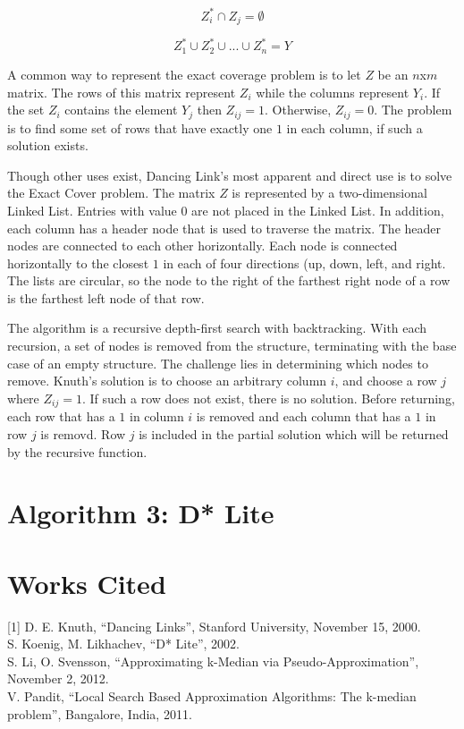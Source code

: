 \documentclass[11pt]{article}
\begin{document}
$$Z_{i}^{\ast} \cap Z_{j} = \emptyset $$

$$Z_{1}^{\ast} \cup Z_{2}^{\ast} \cup ... \cup Z_{n}^{\ast} = Y$$

A common way to represent the exact coverage problem is to let $Z$ be an $n$x$m$ matrix. The rows of  this matrix represent $Z_i$ while the columns represent $Y_i$. If the set $Z_i$ contains the element $Y_j$ then $Z_{ij}=1$. Otherwise, $Z_{ij}=0$. The problem is to find some set of rows that have exactly one $1$ in each column, if such a solution exists.

Though other uses exist, Dancing Link's most apparent and direct use is to solve the Exact Cover problem. The matrix $Z$ is represented by a two-dimensional Linked List. Entries with value $0$ are not placed in the Linked List. In addition, each column has a header node that is used to traverse the matrix. The header nodes are connected to each other horizontally. Each node is connected horizontally to the closest $1$ in each of four directions (up, down, left, and right. The lists are circular, so the node to the right of the farthest right node of a row is the farthest left node of that row.

The algorithm is a recursive depth-first search with backtracking. With each recursion, a set of nodes is removed from the structure, terminating with the base case of an empty structure. The challenge lies in determining which nodes to remove. Knuth's solution is to choose an arbitrary column $i$, and choose a row $j$ where $Z_{ij}=1$. If such a row does not exist, there is no solution. Before returning, each row that has a $1$ in column $i$ is removed and each column that has a $1$ in row $j$ is removd. Row $j$ is included in the partial solution which will be returned by the recursive function.

\section*{Algorithm 3: D* Lite}

\section*{Works Cited}

[1] D. E. Knuth, ``Dancing Links'', Stanford University, November 15,  2000.\\\relax
[2] S. Koenig, M. Likhachev, ``D* Lite'', 2002.\\\relax
[3] S. Li, O. Svensson, ``Approximating k-Median via Pseudo-Approximation'', November 2, 2012.\\\relax
[4] V. Pandit, ``Local Search Based Approximation Algorithms: The k-median problem'', Bangalore, India, 2011.\\\relax
\end{document}
